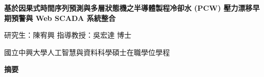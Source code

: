\documentclass[fontset=none, a4paper, 12pt]{ctexart}
\begin{document}
\newpage
\begin{center}
{\fontsize{18}{22}\selectfont\bfseries 基於因果式時間序列預測與多層狀態機之半導體製程冷卻水 (PCW) 壓力漂移早期預警與 Web SCADA 系統整合\par}
\vspace{0.4cm}
{\fontsize{14}{18}\selectfont 研究生：陳宥興 \hspace{2cm} 指導教授：吳宏達 博士\par}
\vspace{0.4cm}
{\fontsize{14}{18}\selectfont 國立中興大學人工智慧與資料科學碩士在職學位學程\par}
\vspace{0.8cm}
{\fontsize{16}{20}\selectfont\bfseries 摘\hspace{2cm}要\par}
\end{center}
\end{document}
